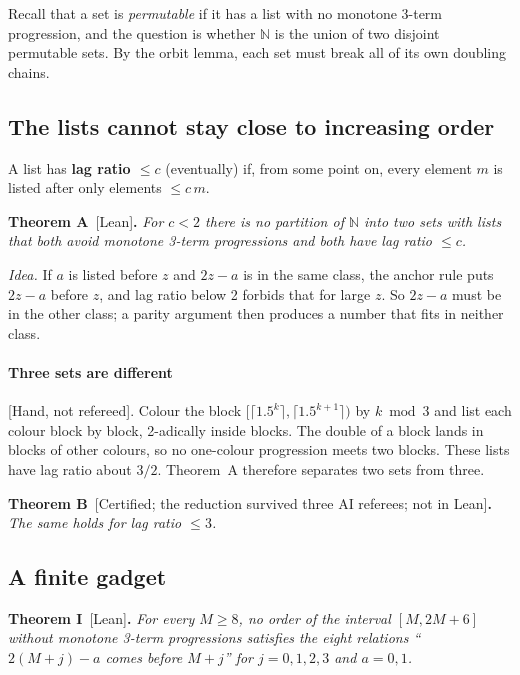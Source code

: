 \documentclass[11pt,letterpaper]{article}
\newcommand{\N}{\mathbb{N}}
\newcommand{\st}[1]{\textnormal{\textsf{\small[#1]}}}
\newenvironment{result}[2]%
  {\par\medskip\noindent\textbf{#1}\ \st{#2}\textbf{.}\enspace\itshape}%
  {\par\medskip}
\newcommand{\idea}[1]{\par\smallskip\noindent\textit{#1.}\enspace}
\begin{document}
Recall that a set is \emph{permutable} if it has a list with no monotone 3-term progression, and the
question is whether $\N$ is the union of two disjoint permutable sets. By the orbit lemma, each set must
break all of its own doubling chains.

\subsection{The lists cannot stay close to increasing order}\label{sec:lag197}

A list has \textbf{lag ratio $\le c$} (eventually) if, from some point on, every element $m$ is listed after
only elements $\le c\,m$.

\begin{result}{Theorem A}{Lean}
For $c < 2$ there is no partition of $\N$ into two sets with lists that both avoid monotone 3-term
progressions and both have lag ratio $\le c$.
\end{result}

\idea{Idea} If $a$ is listed before $z$ and $2z-a$ is in the same class, the anchor rule puts $2z-a$ before
$z$, and lag ratio below 2 forbids that for large $z$. So $2z-a$ must be in the other class; a parity
argument then produces a number that fits in neither class.

\paragraph{Three sets are different} \st{Hand, not refereed}. Colour the block
$[\lceil 1.5^k\rceil, \lceil 1.5^{k+1}\rceil)$ by $k \bmod 3$ and list each colour block by block,
2-adically inside blocks. The double of a block lands in blocks of other colours, so no one-colour
progression meets two blocks. These lists have lag ratio about $3/2$. Theorem~A therefore separates two sets
from three.

\begin{result}{Theorem B}{Certified; the reduction survived three AI referees; not in Lean}
The same holds for lag ratio $\le 3$.
\end{result}

\subsection{A finite gadget}

\begin{result}{Theorem I}{Lean}
For every $M \ge 8$, no order of the interval $[M, 2M+6]$ without monotone 3-term progressions satisfies the
eight relations ``$2(M+j)-a$ comes before $M+j$'' for $j = 0,1,2,3$ and $a = 0,1$.
\end{result}
\end{document}
